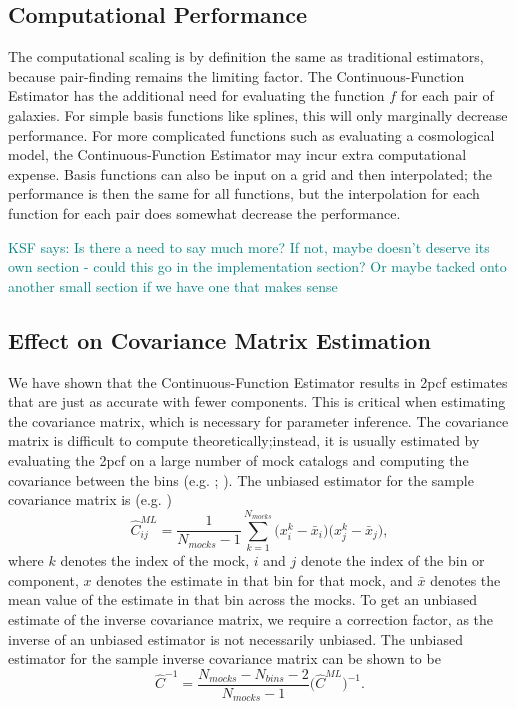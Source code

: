 \documentclass[modern]{aastex62}
\newcommand{\cf}{2pcf\xspace} %
\newcommand{\Est}{The Continuous-Function Estimator\xspace}
\newcommand{\est}{the Continuous-Function Estimator\xspace}
\newcommand{\inv}{^{-1}}
\newcommand{\KSF}[1]{\textcolor{teal}{KSF says: #1}}
\begin{document}
\subsection{Computational Performance}

The computational scaling is by definition the same as traditional estimators, because pair-finding remains the limiting factor.
\Est has the additional need for evaluating the function $f$ for each pair of galaxies.
For simple basis functions like splines, this will only marginally decrease performance.
For more complicated functions such as evaluating a cosmological model, \est may incur extra computational expense.
Basis functions can also be input on a grid and then interpolated; the performance is then the same for all functions, but the interpolation for each function for each pair does somewhat decrease the performance.

\KSF{Is there a need to say much more? If not, maybe doesn't deserve its own section - could this go in the implementation section? Or maybe tacked onto another small section if we have one that makes sense}

\subsection{Effect on Covariance Matrix Estimation}

We have shown that \est results in \cf estimates that are just as accurate with fewer components.
This is critical when estimating the covariance matrix, which is necessary for parameter inference.
The covariance matrix is difficult to compute theoretically;instead, it is usually estimated by evaluating the \cf on a large number of mock catalogs and computing the covariance between the bins (e.g. \citealt{Reid2010}; \citealt{Anderson2014}).
The unbiased estimator for the sample covariance matrix is (e.g. \citealt{Anderson2003})
\begin{equation}
\hat{C}^{ML}_{ij} = \frac{1}{N_{mocks}-1} \sum_{k=1}^{N_{mocks}} \bigg( x^k_i - \bar{x}_i \bigg) \bigg( x^k_j - \bar{x}_j \bigg),
\end{equation}
where $k$ denotes the index of the mock, $i$ and $j$ denote the index of the bin or component, $x$ denotes the estimate in that bin for that mock, and $\bar{x}$ denotes the mean value of the estimate in that bin across the mocks.
To get an unbiased estimate of the inverse covariance matrix, we require a correction factor, as the inverse of an unbiased estimator is not necessarily unbiased.
The unbiased estimator for the sample inverse covariance matrix can be shown to be \citep{Hartlap2007}
\begin{equation}
\hat{C}\inv = \frac{N_{mocks}-N_{bins}-2}{N_{mocks}-1} \bigg( \hat{C}^{ML}\bigg) \inv.
\end{equation}
\end{document}
